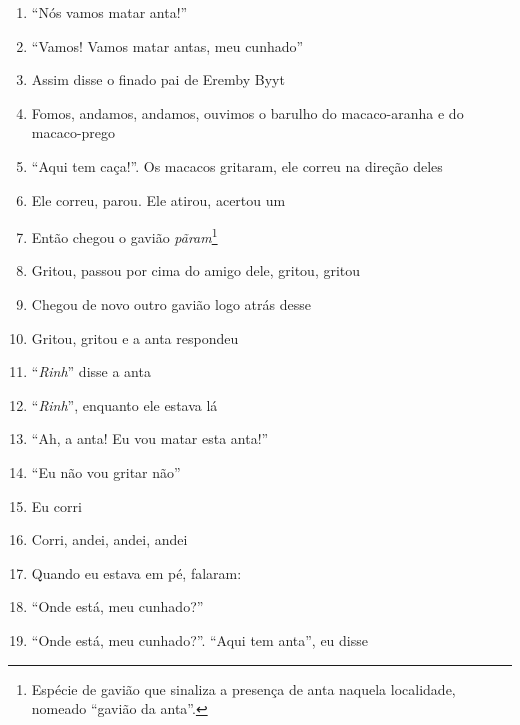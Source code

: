 \begin{enumerate}
 \item ``Nós vamos matar anta!''

 \item ``Vamos! Vamos matar antas, meu cunhado''

 \item Assim disse o finado pai de Eremby Byyt

 \item Fomos, andamos, andamos, ouvimos o barulho do macaco-aranha e do
 macaco-prego

 \item ``Aqui tem caça!''. Os macacos gritaram, ele correu na direção deles

 \item Ele correu, parou. Ele atirou, acertou um

 \begin{center}\end{center}

 \item Então chegou o gavião \textit{pãram}\footnote{Espécie de gavião que
   sinaliza a presença de anta naquela localidade, nomeado ``gavião da
   anta''.}

 \item Gritou, passou por cima do amigo dele, gritou, gritou

 \item Chegou de novo outro gavião logo atrás desse

 \item Gritou, gritou e a anta respondeu

 \item ``\textit{Rinh}'' disse a anta

 \item ``\textit{Rinh}'', enquanto ele estava lá

 \item ``Ah, a anta! Eu vou matar esta anta!''

 \item ``Eu não vou gritar não''

 \item Eu corri

 \item Corri, andei, andei, andei

 \item Quando eu estava em pé, falaram:

 \item ``Onde está, meu cunhado?''

 \item ``Onde está, meu cunhado?''. ``Aqui tem anta'', eu disse


\end{enumerate}
